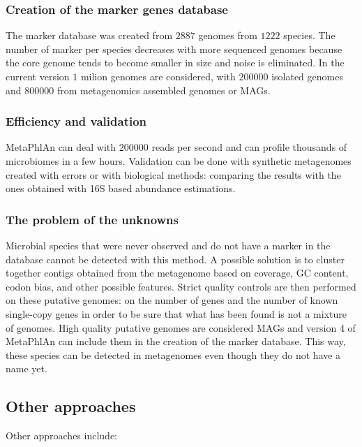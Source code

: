         \subsubsection{Creation of the marker genes database}
        The marker database was created from $2887$ genomes from $1222$ species.
        The number of marker per species decreases with more sequenced genomes because the core genome tends to become smaller in size and noise is eliminated.
        In the current version $1$ milion genomes are considered, with $200000$ isolated genomes and $800000$ from metagenomics assembled genomes or MAGs.

        \subsubsection{Efficiency and validation}
        MetaPhlAn can deal with $200000$ reads per second and can profile thousands of microbiomes in a few hours.
        Validation can be done with synthetic metagenomes created with errors or with biological methods: comparing the results with the ones obtained with 16S based abundance estimations.

        \subsubsection{The problem of the unknowns}
        Microbial species that were never observed and do not have a marker in the database cannot be detected with this method.
        A possible solution is to cluster together contigs obtained from the metagenome based on coverage, GC content, codon bias, and other possible features.
        Strict quality controls are then performed on these putative genomes: on the number of genes and the number of known single-copy genes in order to be sure that what has been found is not a mixture of genomes.
        High quality putative genomes are considered MAGs and version 4 of MetaPhlAn can include them in the creation of the marker database.
        This way, these species can be detected in metagenomes even though they do not have a name yet.

    \subsection{Other approaches}
    Other approaches include:

